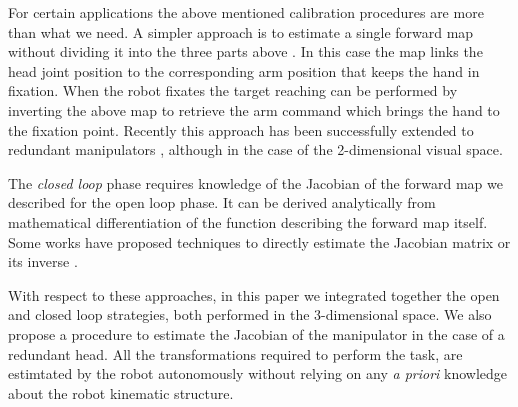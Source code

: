 For certain applications the above mentioned calibration procedures are more than
what we need. A simpler approach is to estimate a single forward map without 
dividing it into the three parts above \cite{blackburn94learning}. In this case
the map links the head joint position to the corresponding arm position that
keeps the hand in fixation. When the robot fixates the target reaching can be 
performed by inverting the above map to retrieve the arm command which brings
the hand to the fixation point. Recently this approach has been successfully 
extended to redundant manipulators \cite{lopes06learning}, although in the 
case of the 2-dimensional visual space.

The {\em closed loop} phase requires knowledge of the Jacobian of the forward map 
we described for the open loop phase. It can be derived analytically from 
mathematical differentiation of the function describing the forward map itself. 
Some works have proposed techniques to directly estimate the Jacobian matrix
\cite{Hosoda94versatile,Mansard06jacobian} or its inverse 
\cite{Lapreste04efficient}.

With respect to these approaches, in this paper we integrated together the 
open \cite{blackburn94learning,Mansard06jacobian} and closed 
\cite{Hosoda94versatile,lopes06learning} loop 
strategies, both performed in the 3-dimensional space.
We also propose a procedure to estimate 
the Jacobian of the manipulator in the case of a redundant head. All the 
transformations required to perform the task, are estimtated by the robot 
autonomously without relying on any \emph{a priori} knowledge about the robot 
kinematic structure.
